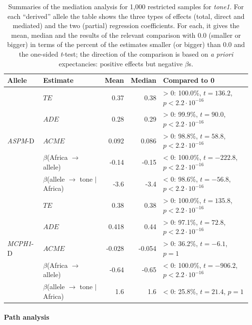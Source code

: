 \documentclass[twoside,twocolumn]{article}
\begin{document}
\begin{table}[h]
  \caption{Summaries of the mediation analysis for 1,000 restricted samples for \textit{tone1}. For each ``derived'' allele the table shows the three types of effects (total, direct and mediated) and the two (partial) regression coefficients. For each, it gives the mean, median and the results of the relevant comparison with 0.0 (smaller or bigger) in terms of the percent of the estimates smaller (or bigger) than 0.0 and the one-sided \textit{t}-test; the direction of the comparison is based on \textit{a priori} expectancies: positive effects but negative $\beta$s.}
  \label{Tab:tone1_mediation_restricted}
  \centering
  \begin{tabular}{|l|l|r|r|l|}
    \toprule
    \textbf{Allele} & \textbf{Estimate} & \textbf{Mean} & \textbf{Median} & \textbf{Compared to 0} \\
    \midrule
    \multirow{5}{*}{\textit{ASPM}-D} & $TE$ & 0.37 & 0.38 & > 0: 100.0\%, $t = 136.2$, $p < 2.2\cdot10^{-16}$ \\
      & $ADE$ & 0.28 & 0.29 & > 0: 99.9\%, $t = 90.0$, $p < 2.2\cdot10^{-16}$ \\
      & $ACME$ & 0.092 & 0.086 & > 0: 98.8\%, $t = 58.8$, $p < 2.2\cdot10^{-16}$ \\
      & $\beta$(Africa $\rightarrow$ allele) & -0.14 & -0.15 & < 0: 100.0\%, $t = -222.8$, $p < 2.2\cdot10^{-16}$ \\
      & $\beta$(allele $\rightarrow$ tone $\mid$ Africa) & -3.6 & -3.4 & < 0: 98.6\%, $t = -56.8$, $p < 2.2\cdot10^{-16}$ \\
    \midrule
    \multirow{5}{*}{\textit{MCPH1}-D} & $TE$ & 0.38 & 0.38 & > 0: 100.0\%, $t = 135.8$, $p < 2.2\cdot10^{-16}$ \\
      & $ADE$ & 0.418 & 0.44 & > 0: 97.1\%, $t = 72.8$, $p < 2.2\cdot10^{-16}$ \\
      & $ACME$ & -0.028 & -0.054 & > 0: 36.2\%, $t = -6.1$, $p = 1$ \\
      & $\beta$(Africa $\rightarrow$ allele) & -0.64 & -0.65 & < 0: 100.0\%, $t = -906.2$, $p < 2.2\cdot10^{-16}$ \\
      & $\beta$(allele $\rightarrow$ tone $\mid$ Africa) & 1.6 & 1.6 & < 0: 25.8\%, $t = 21.4$, $p = 1$ \\
    \bottomrule
  \end{tabular}
\end{table}


\paragraph{Path analysis}
\end{document}
